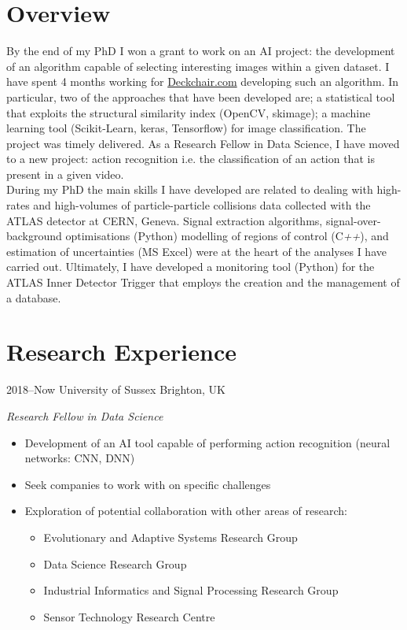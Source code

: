 \documentclass[print]{cv} %
\begin{document}

\section{Overview}

By the end of my PhD I won a grant to work on an AI project: the development of an algorithm capable of selecting interesting images within a given dataset. I have spent 4 months working for \href{http://www.deckchair.com}{Deckchair.com} developing such an algorithm. In particular, two of the approaches that have been developed are; a statistical tool that exploits the structural similarity index (OpenCV, skimage); a machine learning tool (Scikit-Learn, keras, Tensorflow) for image classification. The project was timely delivered. As a Research Fellow in Data Science, I have moved to a new project: action recognition i.e. the classification of an action that is present in a given video. \\During my PhD the main skills I have developed are related to dealing with high-rates and high-volumes of particle-particle collisions data collected with the ATLAS detector at CERN, Geneva. Signal extraction algorithms, signal-over-background optimisations (Python) modelling of regions of control (C\textit{++}), and estimation of uncertainties (MS Excel) were at the heart of the analyses I have carried out. Ultimately, I have developed a monitoring tool (Python) for the ATLAS Inner Detector Trigger that employs the creation and the management of a database.

 \section{Research Experience}
  \begin{entrylist}
    \entry
    {2018--Now}
    {University of Sussex}
    {Brighton, UK}
    {\emph{Research Fellow in Data Science}
    \begin{itemize}
      \item Development of an AI tool capable of performing action recognition (neural networks: CNN, DNN)
      \item Seek companies to work with on specific challenges
      \item Exploration of potential collaboration with other areas of research: 
      \begin{itemize}
        \item Evolutionary and Adaptive Systems Research Group
        \item Data Science Research Group
        \item Industrial Informatics and Signal Processing Research Group
        \item Sensor Technology Research Centre
      \end{itemize}
    \end{itemize}
    }
  \end{entrylist}
\end{document}
